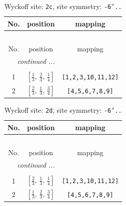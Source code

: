 \documentclass[fleqn,8pt]{jsarticle}
\begin{document}
\renewcommand{\arraystretch}{1.2}
\begin{longtable}{ccc}
\caption{Wyckoff site: {\tt 2c}, site symmetry: {\tt -6'..}}
 \\
 \hline \hline
No. & position & mapping \\ \hline \endfirsthead

\multicolumn{2}{l}{\tablename\ \thetable{}} \\
 \hline \hline
No. & position & mapping \\ \hline \endhead

 \hline \hline
\multicolumn{2}{r}{\footnotesize\it continued ...} \\ \endfoot

 \hline \hline
\multicolumn{2}{r}{} \\ \endlastfoot

1 & $\left[ \frac{1}{3},\, \frac{2}{3},\, \frac{1}{4} \right]$ & {\tt [1,2,3,10,11,12]} \\ \hline
2 & $\left[ \frac{2}{3},\, \frac{1}{3},\, \frac{3}{4} \right]$ & {\tt [4,5,6,7,8,9]} \\
\end{longtable}
\renewcommand{\arraystretch}{1.2}
\begin{longtable}{ccc}
\caption{Wyckoff site: {\tt 2d}, site symmetry: {\tt -6'..}}
 \\
 \hline \hline
No. & position & mapping \\ \hline \endfirsthead

\multicolumn{2}{l}{\tablename\ \thetable{}} \\
 \hline \hline
No. & position & mapping \\ \hline \endhead

 \hline \hline
\multicolumn{2}{r}{\footnotesize\it continued ...} \\ \endfoot

 \hline \hline
\multicolumn{2}{r}{} \\ \endlastfoot

1 & $\left[ \frac{2}{3},\, \frac{1}{3},\, \frac{1}{4} \right]$ & {\tt [1,2,3,10,11,12]} \\ \hline
2 & $\left[ \frac{1}{3},\, \frac{2}{3},\, \frac{3}{4} \right]$ & {\tt [4,5,6,7,8,9]} \\
\end{longtable}
\renewcommand{\arraystretch}{1.2}
\end{document}
